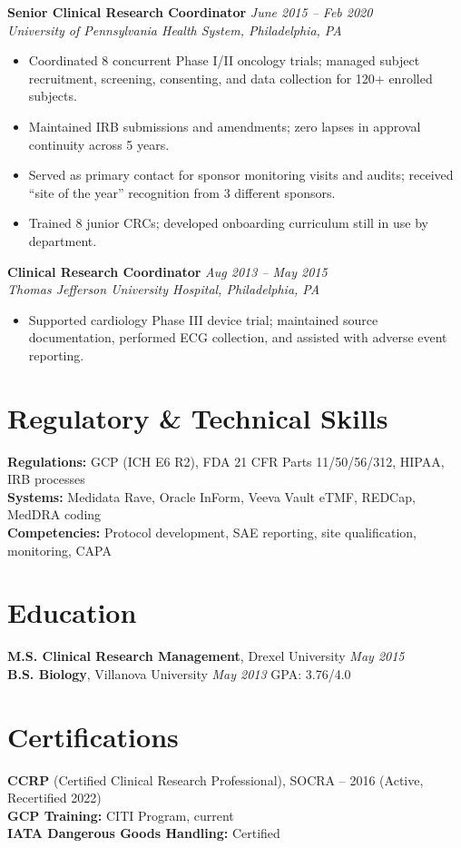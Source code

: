 \documentclass[11pt,a4paper]{article}
\begin{document}
\vspace{4pt}
\noindent\textbf{Senior Clinical Research Coordinator} \hfill \textit{June 2015 -- Feb 2020}\\
\textit{University of Pennsylvania Health System, Philadelphia, PA}
\begin{itemize}
  \item Coordinated 8 concurrent Phase I/II oncology trials; managed subject recruitment, screening, consenting, and data collection for 120+ enrolled subjects.
  \item Maintained IRB submissions and amendments; zero lapses in approval continuity across 5 years.
  \item Served as primary contact for sponsor monitoring visits and audits; received ``site of the year'' recognition from 3 different sponsors.
  \item Trained 8 junior CRCs; developed onboarding curriculum still in use by department.
\end{itemize}

\vspace{4pt}
\noindent\textbf{Clinical Research Coordinator} \hfill \textit{Aug 2013 -- May 2015}\\
\textit{Thomas Jefferson University Hospital, Philadelphia, PA}
\begin{itemize}
  \item Supported cardiology Phase III device trial; maintained source documentation, performed ECG collection, and assisted with adverse event reporting.
\end{itemize}

\section{Regulatory \& Technical Skills}
\textbf{Regulations:} GCP (ICH E6 R2), FDA 21 CFR Parts 11/50/56/312, HIPAA, IRB processes\\
\textbf{Systems:} Medidata Rave, Oracle InForm, Veeva Vault eTMF, REDCap, MedDRA coding\\
\textbf{Competencies:} Protocol development, SAE reporting, site qualification, monitoring, CAPA

\section{Education}
\textbf{M.S. Clinical Research Management}, Drexel University \hfill \textit{May 2015}\\
\textbf{B.S. Biology}, Villanova University \hfill \textit{May 2013} \quad GPA: 3.76/4.0

\section{Certifications}
\textbf{CCRP} (Certified Clinical Research Professional), SOCRA -- 2016 (Active, Recertified 2022)\\
\textbf{GCP Training:} CITI Program, current\\
\textbf{IATA Dangerous Goods Handling:} Certified
\end{document}
